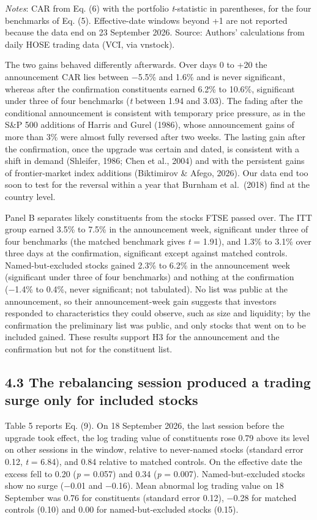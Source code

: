 \documentclass[review,authoryear,12pt]{elsarticle}
\begin{document}
\emph{Notes}: CAR from Eq. (6) with the portfolio \emph{t}-statistic in
parentheses, for the four benchmarks of Eq. (5). Effective-date windows
beyond +1 are not reported because the data end on 23 September 2026.
Source: Authors' calculations from daily HOSE trading data (VCI, via
vnstock).

The two gains behaved differently afterwards. Over days 0 to +20 the
announcement CAR lies between −5.5\% and 1.6\% and is never significant,
whereas after the confirmation constituents earned 6.2\% to 10.6\%,
significant under three of four benchmarks (\emph{t} between 1.94 and
3.03). The fading after the conditional announcement is consistent with
temporary price pressure, as in the S\&P 500 additions of Harris and
Gurel (1986), whose announcement gains of more than 3\% were almost
fully reversed after two weeks. The lasting gain after the confirmation,
once the upgrade was certain and dated, is consistent with a shift in
demand (Shleifer, 1986; Chen et al., 2004) and with the persistent gains
of frontier-market index additions (Biktimirov \& Afego, 2026). Our data
end too soon to test for the reversal within a year that Burnham et
al.~(2018) find at the country level.

Panel B separates likely constituents from the stocks FTSE passed over.
The ITT group earned 3.5\% to 7.5\% in the announcement week,
significant under three of four benchmarks (the matched benchmark gives
\emph{t} = 1.91), and 1.3\% to 3.1\% over three days at the
confirmation, significant except against matched controls.
Named-but-excluded stocks gained 2.3\% to 6.2\% in the announcement week
(significant under three of four benchmarks) and nothing at the
confirmation (−1.4\% to 0.4\%, never significant; not tabulated). No
list was public at the announcement, so their announcement-week gain
suggests that investors responded to characteristics they could observe,
such as size and liquidity; by the confirmation the preliminary list was
public, and only stocks that went on to be included gained. These
results support H3 for the announcement and the confirmation but not for
the constituent list.

\hypertarget{the-rebalancing-session-produced-a-trading-surge-only-for-included-stocks}{%
\subsection*{4.3 The rebalancing session produced a trading surge only
for included
stocks}}

Table 5 reports Eq. (9). On 18 September 2026, the last session before
the upgrade took effect, the log trading value of constituents rose 0.79
above its level on other sessions in the window, relative to never-named
stocks (standard error 0.12, \emph{t} = 6.84), and 0.84 relative to
matched controls. On the effective date the excess fell to 0.20
(\emph{p} = 0.057) and 0.34 (\emph{p} = 0.007). Named-but-excluded
stocks show no surge (−0.01 and −0.16). Mean abnormal log trading value
on 18 September was 0.76 for constituents (standard error 0.12), −0.28
for matched controls (0.10) and 0.00 for named-but-excluded stocks
(0.15).
\end{document}
